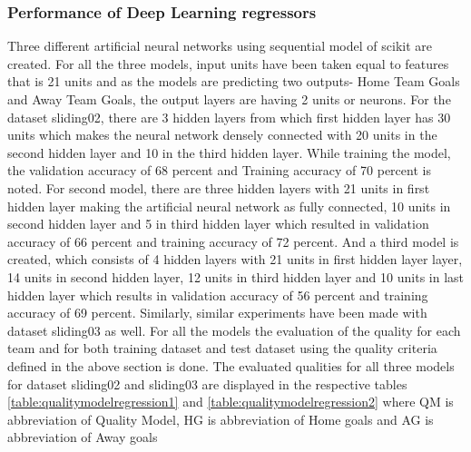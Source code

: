 \subsubsection{Performance of Deep Learning regressors}
Three different artificial neural networks using sequential model of scikit are created. For all the three models, input units have been taken equal to features that is 21 units and as the models are predicting two outputs- Home Team Goals and Away Team Goals, the output layers are having 2 units or neurons. For the dataset sliding02, there are 3 hidden layers from which first hidden layer has 30 units which makes the neural network densely connected with 20 units in the second hidden layer and 10 in the third hidden layer. While training the model, the validation accuracy of 68 percent and Training accuracy of 70 percent is noted. For second model, there are three hidden layers with 21 units in first hidden layer making the artificial neural network as fully connected, 10 units in second hidden layer and 5 in third hidden layer which resulted in validation accuracy of 66 percent and training accuracy of 72 percent. 
And a third model is created, which consists of 4 hidden layers with 21 units in first hidden layer layer, 14 units in second hidden layer, 12 units in third hidden layer and 10 units in last hidden layer which results in validation accuracy of 56 percent and training accuracy of 69 percent.\newline
Similarly, similar experiments have been made with dataset sliding03 as well. For all the models the evaluation of the quality for each team and for both training dataset and test dataset using the quality criteria defined in the above section is done. The evaluated qualities for all three models for dataset sliding02 and sliding03 are displayed in the respective tables \autoref{table:qualitymodelregression1} and \autoref{table:qualitymodelregression2} where QM is abbreviation of Quality Model, HG is abbreviation of Home goals and AG is abbreviation of Away goals\newline

\begin{table}
\centering
{}
\caption{ Quality Model for models with different hidden units for dataset sliding02}
\label{table:qualitymodelregression1}
\end{table}



